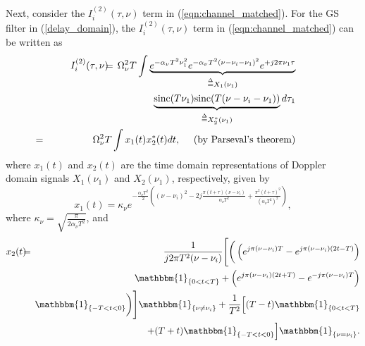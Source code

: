 Next, consider the $I_{i}^{(2)}(\tau,\nu)$ term in (\ref{eqn:channel_matched}). For the GS filter in (\ref{delay_domain}), the  $I_{i}^{(2)}(\tau,\nu)$ term in (\ref{eqn:channel_matched}) can be written as
\begin{eqnarray}
I_{i}^{(2)}(\tau,\nu) & \hspace{-2mm} = & \hspace{-2mm} \Omega_{\nu}^{2}T\int \underbrace{e^{-\alpha_{\nu}T^{2}\nu_{1}^{2}}e^{-\alpha_{\nu}T^{2}(\nu-\nu_{i}-\nu_{1})^{2}}e^{+j2\pi\nu_{1}\tau}}_{\overset{\Delta}{=}X_{1}(\nu_{1})} \nonumber \\
& \hspace{-2mm} & \hspace{-2mm} \underbrace{\mathrm{sinc}(T\nu_{1})\mathrm{sinc}(T(\nu-\nu_{i}-\nu_{1}))}_{\overset{\Delta}{=}X_{2}^{*}(\nu_{1})}d\tau_{1} \nonumber \\
& \hspace{-27mm} = & \hspace{-15mm} \Omega_{\nu}^{2}T
\int x_{1}(t)x_{2}^{*}(t)dt, \quad \text{ (by Parseval's theorem)}
\label{integral_2}
\end{eqnarray}
where $x_1(t)$ and $x_2(t)$ are the time domain representations of Doppler domain signals $X_1(\nu_1)$ and $X_2(\nu_1)$, respectively, given by
\begin{equation}
x_1(t)=\kappa_\nu
e^{-\frac{\alpha_{\nu}T^{2}}{2}\left((\nu-\nu_i)^{2}-2j\frac{\pi(t+\tau)(\nu-\nu_i)}{\alpha_{\nu}T^{2}}+\frac{\pi^{2}(t+\tau)^{2}}{(\alpha_{\nu}T^{2})^{2}}\right)}, 
\end{equation}
where $\kappa_\nu = \sqrt{\frac{\pi}{2\alpha_{\nu}T^{2}}}$, and 
\begin{eqnarray}
x_{2}(t) & \hspace{-2mm} = & \hspace{-2mm} \frac{1}{j2\pi T^{2}(\nu-\nu_i)} \Bigg[\bigg(\left(e^{j\pi (\nu-\nu_i)T}-e^{j\pi (\nu-\nu_i)(2t-T)}\right) \nonumber \\
& \hspace{-2mm} & \hspace{-2mm}
\mathbbm{1}_{\{0<t<T\}} + \left(e^{j\pi (\nu-\nu_i)(2t+T)}-e^{-j\pi (\nu-\nu_i)T}\right)
\nonumber \\
& \hspace{-2mm} & \hspace{-2mm} 
\mathbbm{1}_{\{-T<t<0\}}\bigg)\Bigg] 
\mathbbm{1}_{\{\nu\neq\nu_{i}\}}+\frac{1}{T^{2}}\Big[(T-t)\mathbbm{1}_{\{0<t<T\}}
\nonumber \\
& \hspace{-2mm} & \hspace{-2mm} 
+(T+t)\mathbbm{1}_{\{-T<t<0\}}\Big]\mathbbm{1}_{\{\nu=\nu_{i}\}}.
\end{eqnarray}
